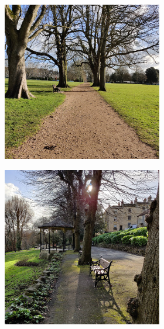 \begin{figure}[!hbtp]
     \centering
     \begin{subfigure}[b]{\textwidth}
         \centering
         \begin{subfigure}[b]{0.32\textwidth}
             \centering
             \includegraphics[width=\textwidth]{content/3-Methods/enviroments/flat_1_modified.jpg}
        \end{subfigure}
        \hfill
         \begin{subfigure}[b]{0.32\textwidth}
             \centering
             \includegraphics[width=\textwidth]{content/3-Methods/enviroments/flat_2_modified.jpg}

\end{subfigure}
\end{subfigure}
\end{figure}
